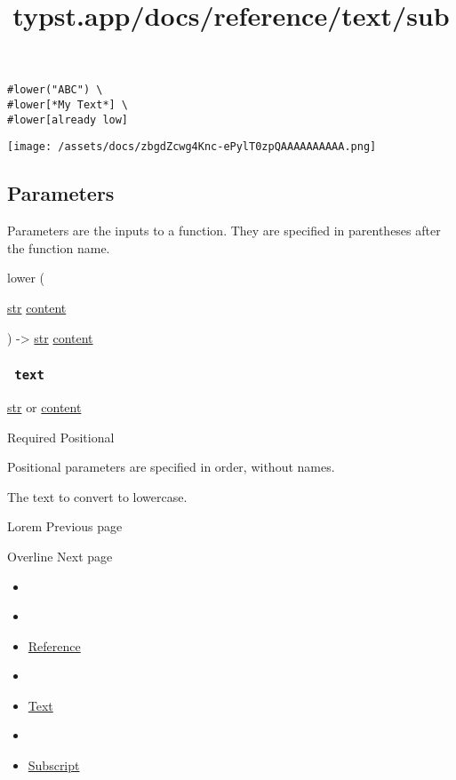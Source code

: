 \begin{verbatim}
#lower("ABC") \
#lower[*My Text*] \
#lower[already low]
\end{verbatim}

\texttt{[image: /assets/docs/zbgdZcwg4Knc-ePylT0zpQAAAAAAAAAA.png]}

\subsection{\texorpdfstring{{ Parameters
}}{ Parameters }}\label{parameters}

\label{parameters-tooltip}
Parameters are the inputs to a function. They are specified in
parentheses after the function name.

{ lower } (

{ \href{/docs/reference/foundations/str/}{str}
\href{/docs/reference/foundations/content/}{content} }

) -\textgreater{} \href{/docs/reference/foundations/str/}{str}
\href{/docs/reference/foundations/content/}{content}

\subsubsection{\texorpdfstring{\texttt{\ text\ }}{ text }}\label{parameters-text}

\href{/docs/reference/foundations/str/}{str} {or}
\href{/docs/reference/foundations/content/}{content}

{Required} {{ Positional }}

\label{parameters-text-positional-tooltip}
Positional parameters are specified in order, without names.

The text to convert to lowercase.

\href{/docs/reference/text/lorem/}{\pandocbounded{}}

{ Lorem } { Previous page }

\href{/docs/reference/text/overline/}{\pandocbounded{}}

{ Overline } { Next page }


\title{typst.app/docs/reference/text/sub}

\begin{itemize}
\tightlist
\item
  \href{/docs}{}
\item
  
\item
  \href{/docs/reference/}{Reference}
\item
  
\item
  \href{/docs/reference/text/}{Text}
\item
  
\item
  \href{/docs/reference/text/sub/}{Subscript}
\end{itemize}

